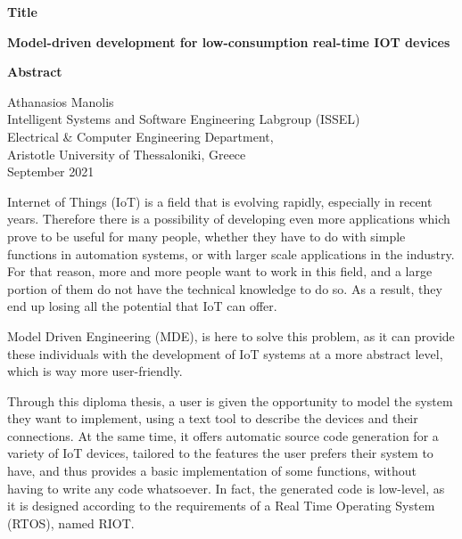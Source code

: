 {\selectfont

{}


\begin{center}
  \centering
  \textbf{\Large{Title}}
  \vspace{0.5cm}

  \textbf{\large{Model-driven development for low-consumption real-time IOT devices}}

  \vspace{1cm}

  \centering
  \textbf{Abstract}
\end{center}


\begin{flushright}
  \vspace{2cm}
  Athanasios Manolis
  \\
  Intelligent Systems and Software Engineering Labgroup (ISSEL)
  \\
  Electrical \& Computer Engineering Department,
  \\
  Aristotle University of Thessaloniki, Greece
  \\
  September 2021
\end{flushright}

}

Internet of Things (IoT) is a field that is evolving rapidly, especially in recent years. Therefore there is a possibility of developing even more applications which prove to be useful for many people, whether they have to do with simple functions in automation systems, or with larger scale applications in the industry. For that reason, more and more people want to work in this field, and a large portion of them do not have the technical knowledge to do so. As a result, they end up losing all the potential that IoT can offer.

Model Driven Engineering (MDE), is here to solve this problem, as it can provide these individuals with the development of IoT systems at a more abstract level, which is way more user-friendly.

Through this diploma thesis, a user is given the opportunity to model the system they want to implement, using a text tool to describe the devices and their connections. At the same time, it offers automatic source code generation for a variety of IoT devices, tailored to the features the user prefers their system to have, and thus provides a basic implementation of some functions, without having to write any code whatsoever. In fact, the generated code is low-level, as it is designed according to the requirements of a Real Time Operating System (RTOS), named RIOT.